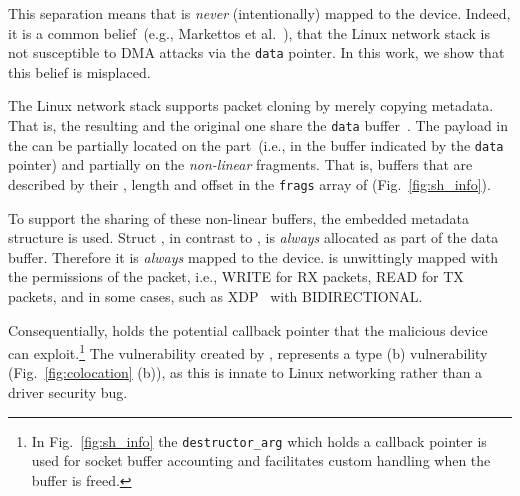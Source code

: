 This separation means that \skb{} is \emph{never} (intentionally) mapped to the device. Indeed, it is a common belief~(e.g., Markettos et al.~\cite{thunder}), that the Linux network stack is not susceptible to DMA attacks via the \texttt{data} pointer. In this work, we show that this belief is misplaced.

The Linux network stack supports packet cloning by merely copying \skb{} metadata. That is, the resulting \skb{} and the original one share the \texttt{data} buffer~\cite{drivers2005linux}. The payload in the \skb{} can be partially located on the \emph{\DIFdelbegin {}\DIFdelend \DIFaddbegin {}\DIFaddend } part~(i.e., in the buffer indicated by the \texttt{data} pointer) and partially on the \emph{non-linear} fragments. That is, buffers that are described by their \page{}, length and offset in the \texttt{frags} array of \shinfo{} (Fig.~\ref{fig:sh_info}). 

To support the sharing of these non-linear buffers, the embedded \shinfo{} metadata structure is used.
Struct \shinfo{}, in contrast to \skb{}, is \emph{always} allocated as part of the data buffer. Therefore it is \emph{always} mapped to the device. \shinfo{} is unwittingly mapped with the permissions of the packet, i.e., WRITE for RX packets, READ for TX packets, and in some cases, such as XDP~\cite{xdp} with BIDIRECTIONAL.

Consequentially, \shinfo{} holds the potential callback pointer that the malicious device can exploit.\footnote{In Fig.~\ref{fig:sh_info} the \texttt{destructor\_arg} which holds a callback pointer is used for socket buffer accounting and facilitates custom handling when the buffer is freed.} The \subpage{} vulnerability created by \shinfo{}, represents a type (b) vulnerability (Fig.~\ref{fig:colocation} (b)), as this is innate to Linux networking rather than a driver security bug. 

